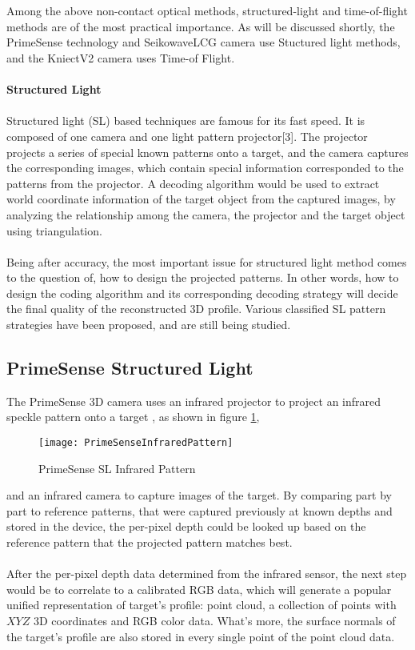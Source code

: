 \\ \\
Among the above non-contact optical methods, structured-light and time-of-flight methods are of the most practical importance.
As will be discussed shortly, the PrimeSense technology and SeikowaveLCG camera use Stuctured light methods, and the KniectV2 camera uses Time-of Flight. 
\\
\\\textbf{Structured Light}\\\\
Structured light (SL) based techniques are famous for its fast speed. It is composed of one camera and one light pattern projector[3]. %
The projector projects a series of special known patterns onto a target, and the camera captures the corresponding images, which contain special information corresponded to the patterns from the projector. A decoding algorithm would be used to extract world coordinate information of the target object from the captured images, by analyzing the relationship among the camera, the projector and the target object using triangulation.\\
\\
Being after accuracy, the most important issue for structured light method comes to the question of, how to design the projected patterns. In other words, how to design the coding algorithm and its corresponding decoding strategy will decide the final quality of the reconstructed 3D profile. Various classified SL pattern strategies have been proposed, and are still being studied.
\\
\subsection{PrimeSense Structured Light}
The PrimeSense 3D camera uses an infrared projector to project an infrared speckle pattern onto a target 
, as shown in figure \ref{PrimeSenseInfraredPattern},\par%
%
\begin{figure}[h]
\centering
\texttt{[image: PrimeSenseInfraredPattern]}
\caption{PrimeSense SL Infrared Pattern}
\label{PrimeSenseInfraredPattern}
\end{figure}%
%
and an infrared camera to capture images of the target. By comparing part by part to reference patterns, that were captured previously at known depths and stored in the device, the per-pixel depth could be looked up based on the reference pattern that the projected pattern matches best. 
\\\\
After the per-pixel depth data determined from the infrared sensor, the next step would be to correlate to a calibrated RGB data, which will generate a popular unified representation of target's profile: point cloud, a collection of points with \(XYZ\) 3D coordinates and RGB color data. What's more, the surface normals of the target's profile are also stored in every single point of the point cloud data. 
\\
